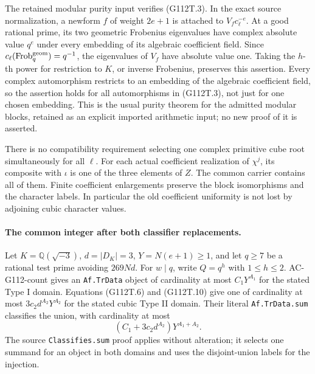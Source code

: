 The retained modular purity input verifies (G112T.3).  In the exact
source normalization, a newform \(f\) of weight \(2e+1\) is attached
to \(V_f c_\ell^{-e}\).  At a good rational prime, its two
geometric Frobenius eigenvalues have complex absolute value \(q^e\)
under every embedding of its algebraic coefficient field.  Since
\(c_\ell(\mathrm{Frob}^{\rm geom}_q)=q^{-1}\), the eigenvalues of
\(V_f\) have absolute value one.  Taking the \(h\)-th power for
restriction to \(K\), or inverse Frobenius, preserves this assertion.
Every complex automorphism restricts to an embedding of the algebraic
coefficient field, so the assertion holds for all automorphisms in
(G112T.3), not just for one chosen embedding.  This is the usual
purity theorem for the admitted modular blocks, retained as an
explicit imported arithmetic input; no new proof of it is asserted.

There is no compatibility requirement selecting one complex primitive
cube root simultaneously for all \(\ell\).  For each actual
coefficient realization of \(\chi^j\), its composite with \(\iota\)
is one of the three elements of \(Z\).  The common carrier contains
all of them.  Finite coefficient enlargements preserve the block
isomorphisms and the character labels.  In particular the old
coefficient uniformity is not lost by adjoining cubic character values.

\paragraph{The common integer after both classifier replacements.}
Let \(K=\mathbb Q(\sqrt{-3})\), \(d=|D_K|=3\),
\(Y=N(e+1)\ge1\), and let \(q\ge7\) be a rational test prime
avoiding \(269Nd\).  For \(w\mid q\), write \(Q=q^h\) with
\(1\le h\le2\).  AC-G112-count gives an
\texttt{Af.TrData} object of cardinality at most \(C_1Y^{A_1}\)
for the stated Type I domain.  Equations (G112T.6) and (G112T.10)
give one of cardinality at most \(3c_2d^{A_2}Y^{A_2}\) for the
stated cubic Type II domain.  Their literal \texttt{Af.TrData.sum}
classifies the union, with cardinality at most
\[
       (C_1+3c_2d^{A_2})Y^{A_1+A_2}.
                                                        \tag{G112T.11}
\]
The source \texttt{Classifies.sum} proof applies without alteration;
it selects one summand for an object in both domains and uses the
disjoint-union labels for the injection.

